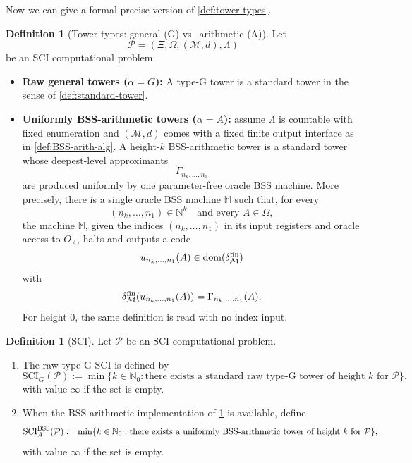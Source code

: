 \documentclass{lmcs} %
\theoremstyle{plain}
\theoremstyle{plain}
\theoremstyle{definition}
\newtheorem{definition}[theorem]{Definition}
\theoremstyle{remark}
\theoremstyle{definition}
\theoremstyle{remark}
\numberwithin{equation}{section}
\newcommand{\SCIG}{\mathrm{SCI}_G}
\newcommand{\SCIA}{\mathrm{SCI}_A}
\begin{document}
Now we can give a formal precise version of \cref{def:tower-types}.
\begin{definition}[Tower types: general (G) vs.\ arithmetic (A)]\label{def:tower-types-BSS}
Let
\[
        \mathcal P=(\Xi,\Omega,(\mathcal M,d),\Lambda)
\]
be an SCI computational problem.
\begin{itemize}
\item \textbf{Raw general towers ($\alpha=G$):} A type-G tower is a standard tower in the sense of \cref{def:standard-tower}.
\item \textbf{Uniformly BSS-arithmetic towers ($\alpha=A$):} assume $\Lambda$ is countable with fixed enumeration and
$(\mathcal{M},d)$ comes with a fixed finite output interface as in
\cref{def:BSS-arith-alg}. A height-\(k\) BSS-arithmetic tower is a standard tower whose deepest-level approximants
\[
        \Gamma_{n_k,\ldots,n_1}
\]
are produced uniformly by one parameter-free oracle BSS machine. More precisely, there is a single oracle BSS machine \(\mathbb M\) such that, for every
\[
        (n_k,\ldots,n_1)\in\mathbb N^k
        \quad\text{and every }A\in\Omega,
\]
the machine \(\mathbb M\), given the indices \((n_k,\ldots,n_1)\) in its input
registers and oracle access to \(O_A\), halts and outputs a code
\[
        u_{n_k,\ldots,n_1}(A)\in\operatorname{dom}(\delta_\mathcal M^{\rm fin})
\]
with
\[
        \delta_\mathcal M^{\rm fin}(u_{n_k,\ldots,n_1}(A))
        =
        \Gamma_{n_k,\ldots,n_1}(A).
\]
For height \(0\), the same definition is read with no index input.
\end{itemize}
\end{definition}

\begin{definition}[SCI]\label{def:sci}
Let \(\mathcal P\) be an SCI computational problem.

\begin{enumerate}
\item[(S1)] The raw type-G SCI is defined by
\[
        \SCIG(\mathcal P)
        :=
        \min\{k\in\mathbb N_0:
        \text{there exists a standard raw type-G tower of height }k\text{ for } \mathcal P\},
\]
with value \(\infty\) if the set is empty.

\item[(S2)] When the BSS-arithmetic implementation of \cref{def:tower-types-BSS} is available, define
\[
        \SCIA^{\rm BSS}(\mathcal P)
        :=
        \min\{k\in\mathbb N_0:
        \text{there exists a uniformly BSS-arithmetic tower of height }k\text{ for } \mathcal P\},
\]
with value \(\infty\) if the set is empty.
\end{enumerate}
\end{definition}
\end{document}
